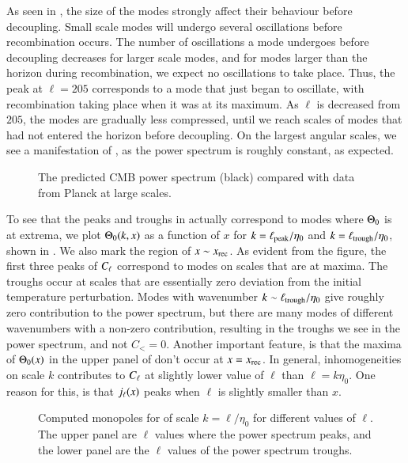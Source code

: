 As seen in , the size of the modes strongly affect their behaviour before decoupling. Small scale modes will undergo several oscillations before recombination occurs. The number of oscillations a mode undergoes before decoupling decreases for larger scale modes, and for modes larger than the horizon during recombination, we expect no oscillations to take place. Thus, the peak at $\ell=205$ corresponds to a mode that just began to oscillate, with recombination taking place when it was at its maximum. As $\ell$ is decreased from $205$, the modes are gradually less compressed, until we reach scales of modes that had not entered the horizon before decoupling. On the largest angular scales, we see a manifestation of , as the power spectrum is roughly constant, as expected. 
\begin{figure}[ht!]
    \caption{The predicted CMB power spectrum (black) compared with data from Planck at large scales. }
    \label{fig:M4:results:peaks_and_troughs_cells}
\end{figure}

To see that the peaks and troughs in  actually correspond to modes where $\Theta_0$ is at extrema, we plot $\Theta_0(k,x)$ as a function of $x$ for $k=\ell_\mathrm{peak}/\eta_0$ and $k=\ell_\mathrm{trough}/\eta_0$, shown in . We also mark the region of $x\sim x_\mathrm{rec}$.  As evident from the figure, the first three peaks of $C_\ell$ correspond to modes on scales that are at maxima. The troughs occur at scales that are essentially zero deviation from the initial temperature perturbation. Modes with wavenumber $k\sim\ell_\mathrm{trough}/\eta_0$ give roughly zero contribution to the power spectrum, but there are many modes of different wavenumbers with a non-zero contribution, resulting in the troughs we see in the power spectrum, and not $C_{\lt}=0$. Another important feature, is that the maxima of $\Theta_0(x)$ in the upper panel of  don't occur at $x=x_\mathrm{rec}$. In general, inhomogeneities on scale $k$ contributes to $C_\ell$ at slightly lower value of $\ell$ than $\ell=k\eta_0$. One reason for this, is that $j_\ell(x)$ peaks when $\ell$ is slightly smaller than $x$. 
\begin{figure}[ht!] 
    \caption{Computed monopoles for of scale $k=\ell/\eta_0$ for different values of $\ell$. The upper panel are $\ell$ values where the power spectrum peaks, and the lower panel are the $\ell$ values of the power spectrum troughs.}
    \label{fig:M4:results:theta0_at_peaks_and_troughs}
\end{figure}

